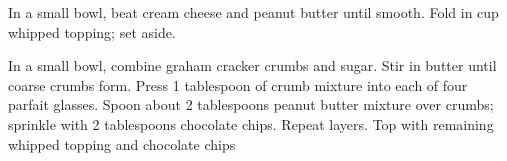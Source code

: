 In a small bowl, beat cream cheese and peanut butter until smooth. Fold in  cup whipped topping; set aside.

In a small bowl, combine graham cracker crumbs and sugar. Stir in butter until coarse crumbs form. Press 1 tablespoon of crumb mixture into each of four parfait glasses. 
Spoon about 2 tablespoons peanut butter mixture over crumbs; 
sprinkle with 2 tablespoons chocolate chips.
Repeat layers. 
Top with remaining whipped topping and chocolate chips
